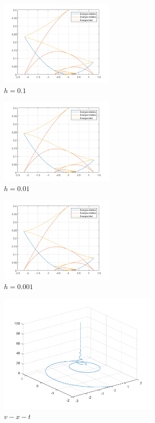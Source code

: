 \documentclass{article}
\begin{document}
\newpage
\clearpage

\begin{figure}[H]
\centering
    \includegraphics[width=0.5\textwidth]{images/002B1.png}
    \caption{$h=0.1$}
\end{figure}

\begin{figure}[H]
\centering
    \includegraphics[width=0.5\textwidth]{images/002B2.png}
    \caption{$h=0.01$}
\end{figure}

\begin{figure}[H]
\centering
    \includegraphics[width=0.5\textwidth]{images/002B3.png}
    \caption{$h=0.001$}
\end{figure}

\clearpage
\newpage

\begin{figure}[H]
\centering
    \includegraphics[width=0.7\textwidth]{images/002C.png}
    \caption{$v-x-t$}
\end{figure}
\end{document}
